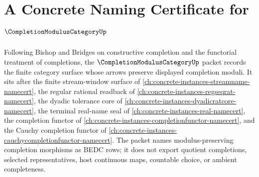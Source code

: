\chapter{A Concrete Naming Certificate for $\CompletionModulusCategoryUp$}
\label{ch:concrete-instances-completion-modulus-category-namecert}

Following Bishop and Bridges on constructive completion and the functorial treatment of completions, the $\CompletionModulusCategoryUp$ packet records the finite category surface whose arrows preserve displayed completion moduli. It sits after the finite stream-window surface of \autoref{ch:concrete-instances-streamname-namecert}, the regular rational readback of \autoref{ch:concrete-instances-regseqrat-namecert}, the dyadic tolerance core of \autoref{ch:concrete-instances-dyadicratcore-namecert}, the terminal real-name seal of \autoref{ch:concrete-instances-real-namecert}, the completion functor of \autoref{ch:concrete-instances-completionfunctor-namecert}, and the Cauchy completion functor of \autoref{ch:concrete-instances-cauchycompletionfunctor-namecert}. The packet names modulus-preserving completion morphisms as BEDC rows; it does not export quotient completions, selected representatives, host continuous maps, countable choice, or ambient completeness.

